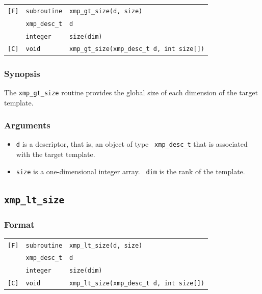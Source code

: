 \begin{tabular}{lll}

\verb![F]!& {\tt subroutine}& {\tt xmp\_gt\_size(d, size)}\\
          & {\tt xmp\_desc\_t} & {\tt d}\\
          & {\tt integer} & {\tt size(dim)}\\

\verb![C]!&  {\tt void}& {\tt xmp\_gt\_size(xmp\_desc\_t d, int size[])}\\

\end{tabular}

\subsubsection*{Synopsis}

The {\tt xmp\_gt\_size} routine provides the global size of each
dimension of the target template.

\subsubsection*{Arguments}

\begin{itemize}
 \item {\tt d} is a descriptor, that is, an object of type {\tt
       xmp\_desc\_t} that is associated with the target template.
 \item {\tt size} is a one-dimensional integer array. {\tt
       dim} is the rank of the template.
\end{itemize}

\subsection{\tt xmp\_lt\_size}

\subsubsection*{Format}

\begin{tabular}{lll}

\verb![F]!& {\tt subroutine}& {\tt xmp\_lt\_size(d, size)}\\
          & {\tt xmp\_desc\_t} & {\tt d}\\
          & {\tt integer} & {\tt size(dim)}\\

\verb![C]!&  {\tt void}& {\tt xmp\_lt\_size(xmp\_desc\_t d, int size[])}\\

\end{tabular}

